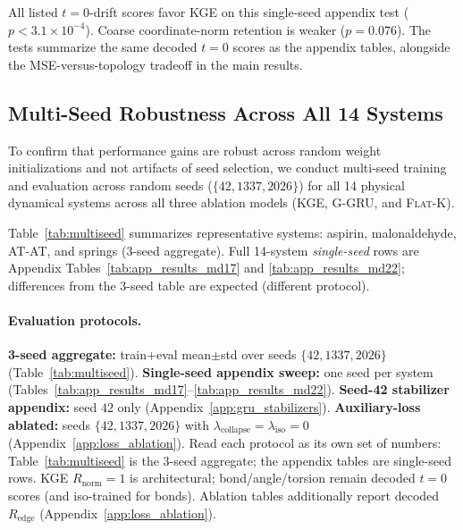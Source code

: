 \documentclass{article}
\newcommand{\GKE}{\textsc{KGE}}
\newcommand{\GGRU}{\textsc{G-GRU}}
\newcommand{\FKoop}{\textsc{Flat-K}}
\begin{document}
All listed $t=0$-drift scores favor \GKE{} on this single-seed appendix test ($p < 3.1\times10^{-4}$).
Coarse coordinate-norm retention is weaker ($p=0.076$). The tests summarize the same decoded $t=0$ scores as the appendix tables, alongside the MSE-versus-topology tradeoff in the main results.

\subsection{Multi-Seed Robustness Across All 14 Systems}
\label{sec:multiseed}

To confirm that performance gains are robust across random weight initializations and not artifacts of seed selection, we conduct multi-seed training and evaluation across random seeds ($\{42, 1337, 2026\}$) for all 14 physical dynamical systems across all three ablation models (\GKE{}, \GGRU{}, and \FKoop{}).

Table~\ref{tab:multiseed} summarizes representative systems: aspirin, malonaldehyde, AT-AT, and springs (3-seed aggregate). Full 14-system \emph{single-seed} rows are Appendix Tables~\ref{tab:app_results_md17} and \ref{tab:app_results_md22}; differences from the 3-seed table are expected (different protocol).

\paragraph{Evaluation protocols.}
\textbf{3-seed aggregate:} train+eval mean$\pm$std over seeds $\{42, 1337, 2026\}$ (Table~\ref{tab:multiseed}).
\textbf{Single-seed appendix sweep:} one seed per system (Tables~\ref{tab:app_results_md17}--\ref{tab:app_results_md22}).
\textbf{Seed-42 stabilizer appendix:} seed $42$ only (Appendix~\ref{app:gru_stabilizers}).
\textbf{Auxiliary-loss ablated:} seeds $\{42,1337,2026\}$ with $\lambda_{\text{collapse}}=\lambda_{\text{iso}}=0$ (Appendix~\ref{app:loss_ablation}).
Read each protocol as its own set of numbers: Table~\ref{tab:multiseed} is the 3-seed aggregate; the appendix tables are single-seed rows.
\GKE{} $R_{\text{norm}}=1$ is architectural; bond/angle/torsion remain decoded $t=0$ scores (and iso-trained for bonds). Ablation tables additionally report decoded $R_{\text{edge}}$ (Appendix~\ref{app:loss_ablation}).
\end{document}
